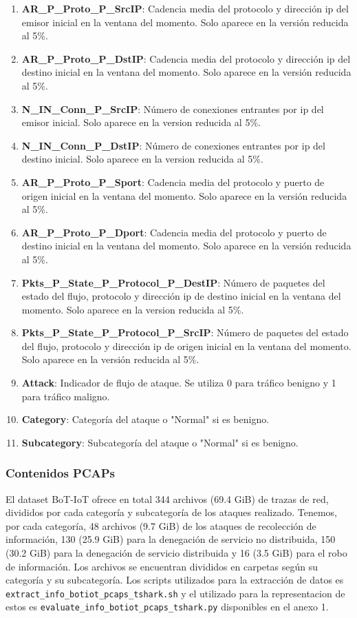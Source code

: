 \begin{enumerate}
    \item \textbf{AR\_P\_Proto\_P\_SrcIP}: Cadencia media del protocolo y dirección \acrshort{ip} del emisor inicial en la ventana del momento. Solo aparece en la versión reducida al 5\%.
    \item \textbf{AR\_P\_Proto\_P\_DstIP}: Cadencia media del protocolo y dirección \acrshort{ip} del destino inicial en la ventana del momento. Solo aparece en la versión reducida al 5\%.
    \item \textbf{N\_IN\_Conn\_P\_SrcIP}: Número de conexiones entrantes por \acrshort{ip} del emisor inicial. Solo aparece en la version reducida al 5\%.
    \item \textbf{N\_IN\_Conn\_P\_DstIP}: Número de conexiones entrantes por \acrshort{ip} del destino inicial. Solo aparece en la version reducida al 5\%.
    \item \textbf{AR\_P\_Proto\_P\_Sport}: Cadencia media del protocolo y puerto de origen inicial en la ventana del momento. Solo aparece en la versión reducida al 5\%.
    \item \textbf{AR\_P\_Proto\_P\_Dport}: Cadencia media del protocolo y puerto de destino inicial en la ventana del momento. Solo aparece en la versión reducida al 5\%.
    \item \textbf{Pkts\_P\_State\_P\_Protocol\_P\_DestIP}: Número de paquetes del estado del flujo, protocolo y dirección \acrshort{ip} de destino inicial en la ventana del momento. Solo aparece en la version reducida al 5\%.
    \item \textbf{Pkts\_P\_State\_P\_Protocol\_P\_SrcIP}: Número de paquetes del estado del flujo, protocolo y dirección \acrshort{ip} de origen inicial en la ventana del momento. Solo aparece en la versión reducida al 5\%.
    \item \textbf{Attack}: Indicador de flujo de ataque. Se utiliza 0 para tráfico benigno y 1 para tráfico maligno.
    \item \textbf{Category}: Categoría del ataque o "Normal" si es benigno.
    \item \textbf{Subcategory}: Subcategoría del ataque o "Normal" si es benigno.
\end{enumerate}

\subsubsection{Contenidos PCAPs}

El dataset BoT-IoT ofrece en total 344 archivos (69.4 GiB) de trazas de red, divididos por cada categoría y subcategoría de los ataques realizado. Tenemos, por cada categoría, 48 archivos (9.7 GiB) de los ataques de recolección de información, 130 (25.9 GiB) para la denegación de servicio no distribuida, 150 (30.2 GiB) para la denegación de servicio distribuida y 16 (3.5 GiB) para el robo de información. Los archivos se encuentran divididos en carpetas según su categoría y su subcategoría. Los scripts utilizados para la extracción de datos es \texttt{extract\_info\_botiot\_pcaps\_tshark.sh} y el utilizado para la representacion de estos es \texttt{evaluate\_info\_botiot\_pcaps\_tshark.py} disponibles en el anexo 1.

